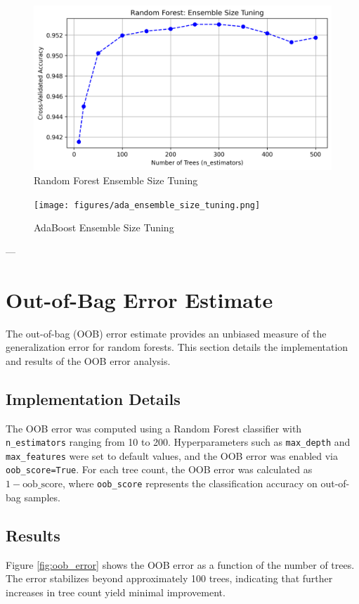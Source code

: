 \documentclass[12pt]{article}
\begin{document}
\begin{figure}[h!]
    \centering
    \includegraphics[width=0.8\linewidth]{figures/k-fold/ensemble_size_tuning.png}
    \caption{Random Forest Ensemble Size Tuning}
    \label{fig:mcc}
\end{figure}

\begin{figure}[h!]
    \centering
    \texttt{[image: figures/ada\_ensemble\_size\_tuning.png]}
    \caption{AdaBoost Ensemble Size Tuning}
    \label{fig:mcc}
\end{figure}

---

\section{Out-of-Bag Error Estimate}
The out-of-bag (OOB) error estimate provides an unbiased measure of the generalization error for random forests. This section details the implementation and results of the OOB error analysis.

\subsection*{Implementation Details}
The OOB error was computed using a Random Forest classifier with \texttt{n\_estimators} ranging from 10 to 200. Hyperparameters such as \texttt{max\_depth} and \texttt{max\_features} were set to default values, and the OOB error was enabled via \texttt{oob\_score=True}. For each tree count, the OOB error was calculated as \( 1 - \text{oob\_score} \), where \texttt{oob\_score} represents the classification accuracy on out-of-bag samples.

\subsection*{Results}
Figure \ref{fig:oob_error} shows the OOB error as a function of the number of trees. The error stabilizes beyond approximately 100 trees, indicating that further increases in tree count yield minimal improvement.
\end{document}
